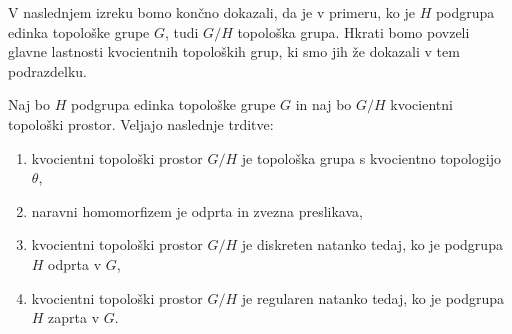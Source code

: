 \documentclass[mat1]{fmfdelo}
\begin{document}
V naslednjem izreku bomo končno dokazali, da je v primeru, ko je $H$ podgrupa edinka topološke grupe $G$, tudi $G/H$ topološka grupa. Hkrati bomo povzeli glavne lastnosti kvocientnih topoloških grup, ki smo jih že dokazali v tem podrazdelku.
\begin{izrek}\label{izr:kvocpovzetek}
Naj bo $H$ podgrupa edinka topološke grupe $G$ in naj bo $G/H$ kvocientni topološki prostor. Veljajo naslednje trditve:
\begin{enumerate}
\item kvocientni topološki prostor $G/H$ je topološka grupa s kvocientno topologijo $\theta$,\label{podtrd:kvoc1}
\item naravni homomorfizem je odprta in zvezna preslikava,\label{podtrd:kvoc2}
\item kvocientni topološki prostor $G/H$ je diskreten natanko tedaj, ko je podgrupa $H$ odprta v $G$,\label{podtrd:kvoc3}
\item kvocientni topološki prostor $G/H$ je regularen natanko tedaj, ko je pod\-gru\-pa $H$ zaprta v $G$.\label{podtrd:kvoc4}
\end{enumerate}
\end{izrek}
\end{document}
